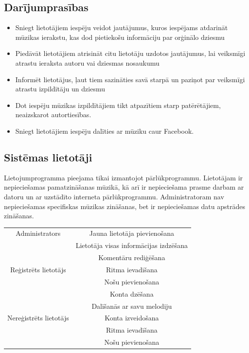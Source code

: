 \documentclass[12pt]{article}
\begin{document}
\subsection{Darījumprasības}
\begin{itemize}
\item Sniegt lietotājiem iespēju veidot jautājumus, kuros iespējams atdarināt mūzikas ierakstu, kas dod pietiekošu informāciju par orģinālo dziesmu
\item Piedāvāt lietotājiem atrisināt citu lietotāju uzdotos jautājumus, lai veiksmīgi atrastu ieraksta autoru vai dziesmas nosaukumu
\item Informēt lietotājus, ļaut tiem sazināties savā starpā un paziņot par veiksmīgi atrastu izpildītāju un dziesmu
\item Dot iespēju mūzikas izpildītājiem tikt atpazītiem starp patērētājiem, neaizskarot autortiesības.
\item Sniegt lietotājiem iespēju dalīties ar mūziku caur Facebook.
\end{itemize}

\subsection{Sistēmas lietotāji}

Lietojumprogramma pieejama tikai izmantojot pārlūkprogrammu. Lietotājam ir nepieciešamas pamatzināšanas mūzikā, kā arī ir nepieciešama prasme darbam ar datoru un ar uzstādīto interneta pārlūkprogrammu. Administratoram nav nepieciešamas specifiskas mūzikas zināšanas, bet ir nepieciešamas datu apstrādes zināšanas.\\

\begin{center}
\begin{tabular}{|c|c|}
\hline
Administrators & Jauna lietotāja pievienošana  \\
& Lietotāja visas informācijas izdzēšana \\
& Komentāru rediģēšana \\
\hline
Reģistrēts lietotājs & Ritma ievadīšana \\
& Nošu pievienošana \\
& Konta dzēšana \\
& Dalīšanās ar savu melodiju\\
\hline
Nereģistrēts lietotājs & Konta izveidošana \\
& Ritma ievadīšana \\
& Nošu pievienošana \\
\hline
\end{tabular}
\end{center}
\end{document}

